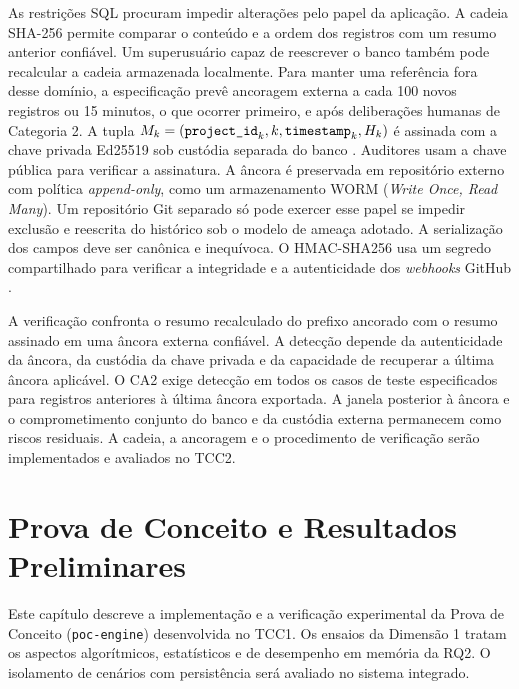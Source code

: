 \documentclass[12pt,openany,oneside,a4paper,english,brazilian,sumario=tradicional]{abntex2}
\begin{document}
As restrições SQL procuram impedir alterações pelo papel da aplicação. A cadeia SHA-256 permite comparar o conteúdo e a ordem dos registros com um resumo anterior confiável. Um superusuário capaz de reescrever o banco também pode recalcular a cadeia armazenada localmente. Para manter uma referência fora desse domínio, a especificação prevê ancoragem externa a cada 100 novos registros ou 15 minutos, o que ocorrer primeiro, e após deliberações humanas de Categoria 2. A tupla $M_k=(\texttt{project\_\allowbreak id}_k, k, \texttt{timestamp}_k, H_k)$ é assinada com a chave privada Ed25519 sob custódia separada do banco \cite{rfc8032}. Auditores usam a chave pública para verificar a assinatura. A âncora é preservada em repositório externo com política \textit{append-only}, como um armazenamento WORM (\textit{Write Once, Read Many}). Um repositório Git separado só pode exercer esse papel se impedir exclusão e reescrita do histórico sob o modelo de ameaça adotado. A serialização dos campos deve ser canônica e inequívoca. O HMAC-SHA256 usa um segredo compartilhado para verificar a integridade e a autenticidade dos \textit{webhooks} GitHub \cite{rfc2104}.

A verificação confronta o resumo recalculado do prefixo ancorado com o resumo assinado em uma âncora externa confiável. A detecção depende da autenticidade da âncora, da custódia da chave privada e da capacidade de recuperar a última âncora aplicável. O CA2 exige detecção em todos os casos de teste especificados para registros anteriores à última âncora exportada. A janela posterior à âncora e o comprometimento conjunto do banco e da custódia externa permanecem como riscos residuais. A cadeia, a ancoragem e o procedimento de verificação serão implementados e avaliados no TCC2.

\chapter{Prova de Conceito e Resultados Preliminares}\label{cap:poc}

Este capítulo descreve a implementação e a verificação experimental da Prova de Conceito (\texttt{poc-engine}) desenvolvida no TCC1. Os ensaios da Dimensão 1 tratam os aspectos algorítmicos, estatísticos e de desempenho em memória da RQ2. O isolamento de cenários com persistência será avaliado no sistema integrado.
\end{document}
